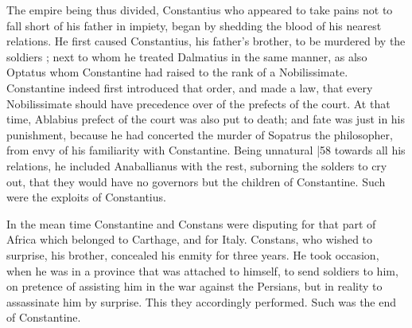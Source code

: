 The empire being thus divided, Constantius who appeared to take pains not to fall short of his father in impiety, began by shedding the blood of his nearest relations. He first caused Constantius, his father's brother, to be murdered by the soldiers ; next to whom he treated Dalmatius in the same manner, as also Optatus whom Constantine had raised to the rank of a Nobilissimate. Constantine indeed first introduced that order, and made a law, that every Nobilissimate should have precedence over of the prefects of the court. At that time, Ablabius prefect of the court was also put to death; and fate was just in his punishment, because he had concerted the murder of Sopatrus the philosopher, from envy of his familiarity with Constantine. Being unnatural
|58 towards all his relations, he included Anaballianus with the rest, suborning the solders to cry out, that they would have no governors but the children of Constantine. Such were the exploits of Constantius.

In the mean time Constantine and Constans were disputing for that part of Africa which belonged to Carthage, and for Italy. Constans, who wished to surprise, his brother, concealed his enmity for three years. He took occasion, when he was in a province that was attached to himself, to send soldiers to him, on pretence of assisting him in the war against the Persians, but in reality to assassinate him by surprise. This they accordingly performed. Such was the end of Constantine.

